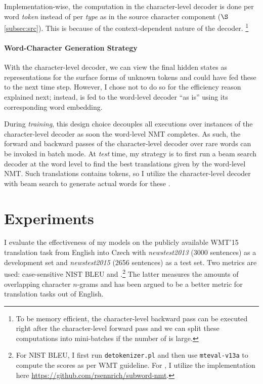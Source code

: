 Implementation-wise, the computation in the
character-level decoder is done per word {\it token} instead of per {\it type} as in the source
character component ($\S$\ref{subsec:src}). 
This is because of the context-dependent nature of the decoder.
\footnote{To be memory efficient, the character-level backward pass can be executed right
after the character-level forward pass
and we can split these computations into
mini-batches if the number of \unk{} is large.}

\paragraph{Word-Character Generation Strategy}
\label{subsubsec:strategy}
With the character-level decoder, we can view the final hidden states as representations for
the surface forms of unknown tokens and could have fed these to the next
time step. However, I chose not to do so for the efficiency reason explained
next; instead, \unk{} is fed to the word-level decoder
``as is'' using its corresponding word embedding.

During {\it training}, this design choice decouples all executions over \unk{} instances of the
character-level decoder as soon the word-level NMT
completes. As such, the forward and backward passes of the character-level
decoder over rare words can be invoked in batch mode. At {\it test} time,
my strategy is to first run a beam search decoder at the word level to
find the best translations given by the
word-level NMT. Such translations contains \unk{} tokens, so I utilize the 
character-level decoder with beam search to generate actual words for these \unk{}.

\section{Experiments}
\label{sec:exp}
I evaluate the effectiveness of my models on the publicly available WMT'15
translation task from English into Czech with 
{\it newstest2013} (3000 sentences) as
a development set %
and {\it newstest2015} (2656 sentences) as a test set. Two metrics are used: case-sensitive NIST BLEU \cite{Papineni02bleu}
and \chr{} \cite{chrf}.\footnote{For NIST BLEU, I first run
\texttt{detokenizer.pl} %
and then use \texttt{mteval-v13a}
to compute the scores as per WMT guideline. For \chr{}, I utilize the implementation here
\url{https://github.com/rsennrich/subword-nmt}.}
The latter measures the amounts of overlapping character $n$-grams and has
been argued to be a better metric for translation tasks out of English.

